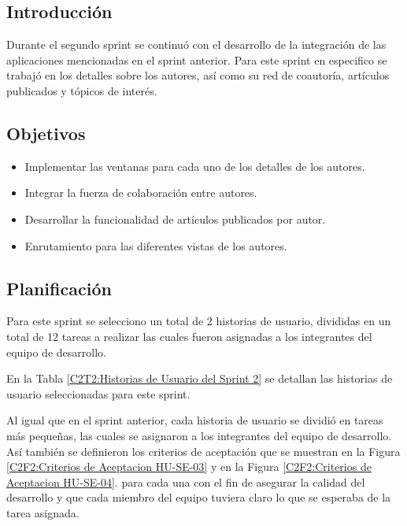 
\subsection{Introducción}
Durante el segundo sprint se continuó con el desarrollo de la integración 
de las aplicaciones mencionadas en el sprint anterior.
Para este sprint en especifico se trabajó en los detalles sobre los autores, 
así como su red de coautoría, artículos publicados y tópicos de interés.

\subsection{Objetivos}
\begin{itemize}
    \item Implementar las ventanas para cada uno de los detalles de los autores.
    \item Integrar la fuerza de colaboración entre autores.
    \item Desarrollar la funcionalidad de artículos publicados por autor.
    \item Enrutamiento para las diferentes vistas de los autores.
\end{itemize}

\subsection{Planificación}
Para este sprint se selecciono un total de 2 historias de usuario, divididas en un total de
12 tareas a realizar las cuales fueron asignadas a los integrantes del equipo de desarrollo.

En la Tabla \ref{C2T2:Historias de Usuario del Sprint 2} se detallan las historias de usuario seleccionadas para este sprint.



Al igual que en el sprint anterior, cada historia de usuario se dividió en tareas más pequeñas,
las cuales se asignaron a los integrantes del equipo de desarrollo. Así también se definieron
los criterios de aceptación que se muestran en la Figura \ref{C2F2:Criterios de Aceptacion HU-SE-03} y en la Figura \ref{C2F2:Criterios de Aceptacion HU-SE-04}.
para cada una con el fin de asegurar la calidad del desarrollo y
que cada miembro del equipo tuviera claro lo que se esperaba de la tarea asignada.

